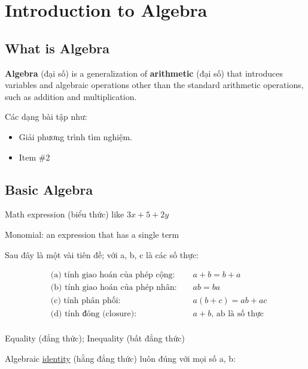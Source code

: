 \chapter{Introduction to Algebra}

\section{What is Algebra}

\textbf{Algebra} (đại số) is a generalization of \textbf{arithmetic} (đại số) that introduces variables and algebraic operations other than the standard arithmetic operations, such as addition and multiplication.

Các dạng bài tập như:
\begin{itemize}
  \item Giải phương trình tìm nghiệm.
  \item Item \#2
\end{itemize}

\section{Basic Algebra}

Math expression (biểu thức) like \(3x + 5 + 2y\)

Monomial: an expression that has a single term

Sau đây là một vài tiên đề; với a, b, c là các số thực:

\begin{equation}
    \begin{aligned}
      &\text{(a) tính giao hoán của phép cộng: } &&a+b = b+a\\
      &\text{(b) tính giao hoán của phép nhân: } &&ab = ba\\
      &\text{(c) tính phân phối: } &&a(b+c) = ab + ac\\
      &\text{(d) tính đóng (closure): } &&a + b \text{, ab là số thực}\\
    \end{aligned}
    \label{key}
\end{equation}


Equality (đẳng thức); Inequality (bất đẳng thức)

Algebraic \href{https://en.wikipedia.org/wiki/Identity_(mathematics)}{identity} (hằng đẳng thức) luôn đúng với mọi số a, b:

